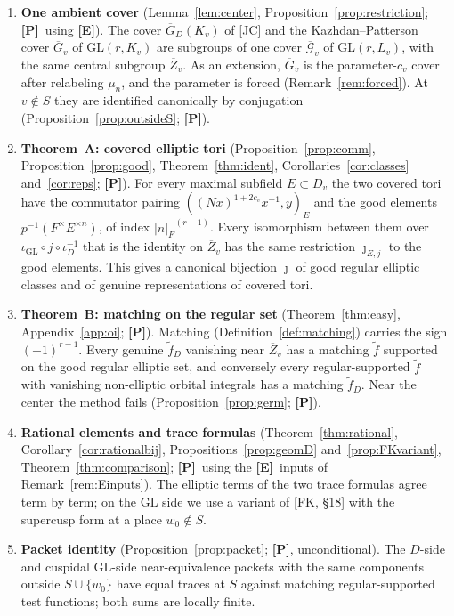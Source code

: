 \documentclass[12pt]{article}
\newcommand{\ov}[1]{\overline{#1}}
\newcommand{\GL}{\mathrm{GL}}
\newcommand{\Gb}{\ov{G}}
\newcommand{\Zb}{\ov{Z}}
\newcommand{\GDb}{\ov{G}_D}
\newcommand{\cGb}{\ov{\mathcal{G}}}
\newcommand{\iD}{\iota_D}
\newcommand{\iG}{\iota_{\GL}}
\newcommand{\jj}{\jmath}
\newcommand{\Pv}{\textbf{[P]}}
\newcommand{\Ev}{\textbf{[E]}}
\theoremstyle{plain}
\theoremstyle{definition}
\begin{document}
\begin{enumerate}[leftmargin=*,label=\arabic*.]
\item \textbf{One ambient cover} (Lemma~\ref{lem:center}, Proposition~\ref{prop:restriction}; \Pv\ using \Ev). The cover $\GDb(K_v)$ of [JC] and the Kazhdan--Patterson cover $\Gb_v$ of $\GL(r,K_v)$ are subgroups of one cover $\cGb_v$ of $\GL(r,L_v)$, with the same central subgroup $\Zb_v$. As an extension, $\Gb_v$ is the parameter-$c_v$ cover after relabeling $\mu_n$, and the parameter is forced (Remark~\ref{rem:forced}). At $v\notin S$ they are identified canonically by conjugation (Proposition~\ref{prop:outsideS}; \Pv).
\item \textbf{Theorem~A: covered elliptic tori} (Proposition~\ref{prop:comm}, Proposition~\ref{prop:good}, Theorem~\ref{thm:ident}, Corollaries~\ref{cor:classes} and~\ref{cor:reps}; \Pv). For every maximal subfield $E\subset D_v$ the two covered tori have the commutator pairing $((Nx)^{1+2c_v}x^{-1},y)_E$ and the good elements $p^{-1}(F^\times E^{\times n})$, of index $|n|_F^{-(r-1)}$. Every isomorphism between them over $\iG\circ j\circ\iD^{-1}$ that is the identity on $\Zb_v$ has the same restriction $\jj_{E,j}$ to the good elements. This gives a canonical bijection $\jj$ of good regular elliptic classes and of genuine representations of covered tori.
\item \textbf{Theorem~B: matching on the regular set} (Theorem~\ref{thm:easy}, Appendix~\ref{app:oi}; \Pv). Matching (Definition~\ref{def:matching}) carries the sign $(-1)^{r-1}$. Every genuine $\tilde f_D$ vanishing near $\Zb_v$ has a matching $\tilde f$ supported on the good regular elliptic set, and conversely every regular-supported $\tilde f$ with vanishing non-elliptic orbital integrals has a matching $\tilde f_D$. Near the center the method fails (Proposition~\ref{prop:germ}; \Pv).
\item \textbf{Rational elements and trace formulas} (Theorem~\ref{thm:rational}, Corollary~\ref{cor:rationalbij}, Propositions~\ref{prop:geomD} and~\ref{prop:FKvariant}, Theorem~\ref{thm:comparison}; \Pv\ using the \Ev\ inputs of Remark~\ref{rem:Einputs}). The elliptic terms of the two trace formulas agree term by term; on the $\GL$ side we use a variant of [FK, \S18] with the supercusp form at a place $w_0\notin S$.
\item \textbf{Packet identity} (Proposition~\ref{prop:packet}; \Pv, unconditional). The $D$-side and cuspidal $\GL$-side near-equivalence packets with the same components outside $S\cup\{w_0\}$ have equal traces at $S$ against matching regular-supported test functions; both sums are locally finite.

\end{enumerate}
\end{document}

